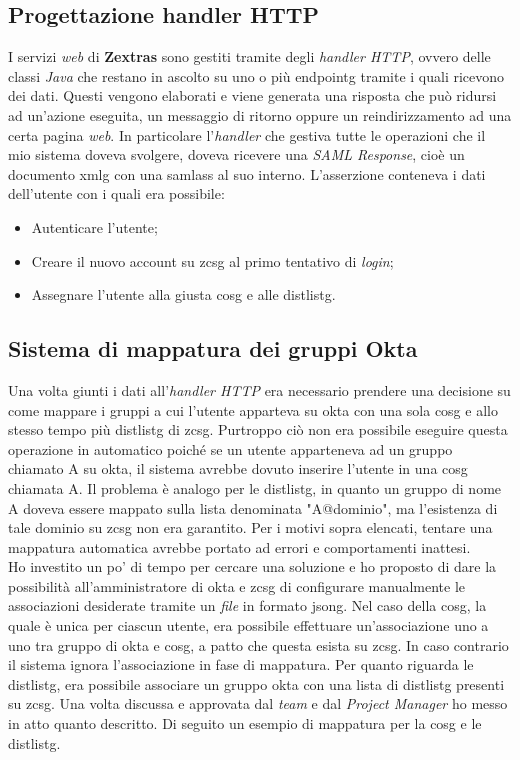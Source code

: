 \subsection{Progettazione handler HTTP}
I servizi \textit{web} di \textbf{Zextras} sono gestiti tramite degli \textit{handler HTTP}, ovvero delle classi \textit{Java} che restano in ascolto su uno o più \gls{endpointg} tramite i quali ricevono dei dati. Questi vengono elaborati e viene generata una risposta che può ridursi ad un'azione eseguita, un messaggio di ritorno oppure un reindirizzamento ad una certa pagina \textit{web}. In particolare l'\textit{handler} che gestiva tutte le operazioni che il mio sistema doveva svolgere, doveva ricevere una \textit{SAML Response}, cioè un documento \gls{xmlg} con una \gls{samlass} al suo interno. L'asserzione conteneva i dati dell'utente con i quali era possibile:
\begin{itemize}
    \setlength\itemsep{0em}
    \item Autenticare l'utente;
    \item Creare il nuovo account su \gls{zcsg} al primo tentativo di \textit{login};
    \item Assegnare l'utente alla giusta \gls{cosg} e alle \gls{distlistg}.
\end{itemize}
\subsection{Sistema di mappatura dei gruppi Okta}
Una volta giunti i dati all'\textit{handler HTTP} era necessario prendere una decisione su come mappare i gruppi a cui l'utente apparteva su \gls{okta} con una sola \gls{cosg} e allo stesso tempo più \gls{distlistg} di \gls{zcsg}. Purtroppo ciò non era possibile eseguire questa operazione in automatico poiché se un utente apparteneva ad un gruppo chiamato A su \gls{okta}, il sistema avrebbe dovuto inserire l'utente in una \gls{cosg} chiamata A. Il problema è analogo per le \gls{distlistg}, in quanto un gruppo di nome A doveva essere mappato sulla lista denominata "A@dominio", ma l'esistenza di tale dominio su \gls{zcsg} non era garantito. Per i motivi sopra elencati, tentare una mappatura automatica avrebbe portato ad errori e comportamenti inattesi. \\
Ho investito un po' di tempo per cercare una soluzione e ho proposto di dare la possibilità all'amministratore di \gls{okta} e \gls{zcsg} di configurare manualmente le associazioni desiderate tramite un \textit{file} in formato \gls{jsong}. Nel caso della \gls{cosg}, la quale è unica per ciascun utente, era possibile effettuare un'associazione uno a uno tra gruppo di \gls{okta} e \gls{cosg}, a patto che questa esista su \gls{zcsg}. In caso contrario il sistema ignora l'associazione in fase di mappatura. Per quanto riguarda le \gls{distlistg}, era possibile associare un gruppo \gls{okta} con una lista di \gls{distlistg} presenti su \gls{zcsg}.
Una volta discussa e approvata dal \textit{team} e dal \textit{Project Manager} ho messo in atto quanto descritto. Di seguito un esempio di mappatura per la \gls{cosg} e le \gls{distlistg}.

